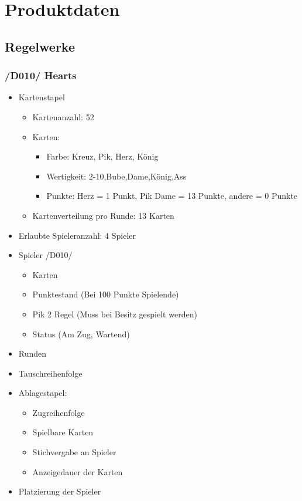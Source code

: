 \documentclass{article}
\begin{document}
\section{Produktdaten}
\subsection{\gls{Regelwerk}e}
\subsubsection{/D010/ Hearts}	
\begin{itemize}
	\item Kartenstapel
	\begin{itemize}
		\item Kartenanzahl: 52
		\item Karten:
		\begin{itemize}
			\item Farbe: Kreuz, Pik, Herz, König
			\item Wertigkeit: 2-10,Bube,Dame,König,Ass
			\item Punkte: Herz = 1 Punkt, Pik Dame = 13 Punkte, andere = 0 Punkte
		\end{itemize}	
		\item Kartenverteilung pro Runde: 13 Karten				
	\end{itemize}
	\item Erlaubte Spieleranzahl: 4 Spieler		
	\item Spieler /D010/
	\begin{itemize}
		\item Karten
		\item Punktestand (Bei 100 Punkte Spielende)
		\item Pik 2 Regel (Muss bei Besitz gespielt werden)
		\item Status (Am Zug, Wartend)
	\end{itemize}
	\item Runden
	\item Tauschreihenfolge	
	\item Ablagestapel:
	\begin{itemize}
		\item Zugreihenfolge
		\item Spielbare Karten
		\item Stichvergabe an Spieler
		\item Anzeigedauer der Karten
	\end{itemize}
	\item Platzierung der Spieler
\end{itemize}
	
\end{document}
